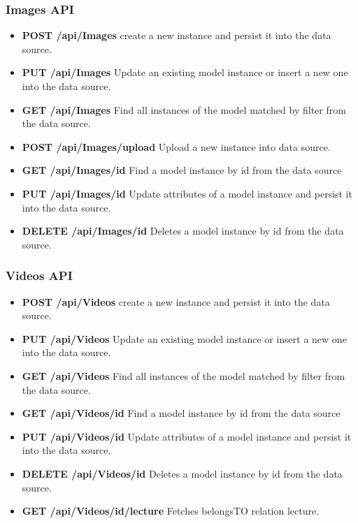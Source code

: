 \subsubsection{ Images API}

\begin{itemize}
\item \textbf{POST /api/Images} create a new instance and persist it into the data source.
\item \textbf{PUT /api/Images} Update an existing model instance or insert a new one into the data source.
\item \textbf{GET /api/Images} Find all instances of the model matched by filter from the  data source.
\item \textbf{POST /api/Images/upload} Upload a new instance into data source.
\item \textbf{GET /api/Images/id} Find a model instance by id from the data source
\item \textbf{PUT /api/Images/id} Update attributes of a model instance and persist it into the data source.
\item \textbf{DELETE /api/Images/id} Deletes a model instance by id from the data 
source.
\end{itemize}

\subsubsection{ Videos API}
\begin{itemize}
\item \textbf{POST /api/Videos} create a new instance and persist it into the data source.
\item \textbf{PUT /api/Videos} Update an existing model instance or insert a new one into the data source.
\item \textbf{GET /api/Videos} Find all instances of the model matched by filter from the  data source.
\item \textbf{GET /api/Videos/id} Find a model instance by id from the data source
\item \textbf{PUT /api/Videos/id} Update attributes of a model instance and persist it into the data source.
\item \textbf{DELETE /api/Videos/id} Deletes a model instance by id from the data 
source. 
\item \textbf{GET /api/Videos/id/lecture} Fetches belongsTO relation lecture.
\end{itemize}

